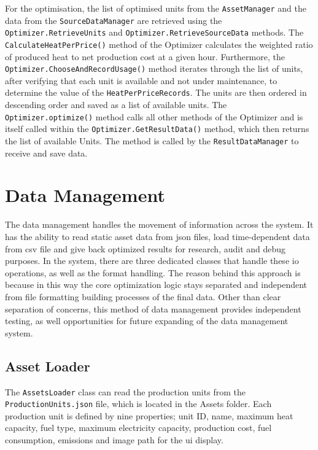 For the optimisation, the list of optimised units from the \texttt{AssetManager} and the data from the \texttt{SourceDataManager} are retrieved using the \texttt{Optimizer.}\allowbreak\texttt{RetrieveUnits} and \texttt{Optimizer.}\allowbreak\texttt{RetrieveSourceData} methods. 
The \allowbreak\texttt{CalculateHeatPerPrice()} method of the Optimizer calculates the weighted ratio of produced heat to net production cost at a given hour.
Furthermore, the \texttt{Optimizer.}\allowbreak\texttt{ChooseAndRecordUsage()} method iterates through the list of units, after verifying that each unit is available and not under maintenance, to determine the value of the \texttt{HeatPerPriceRecords}. The units are then ordered in descending order and saved as a list of available units. 
The \texttt{Optimizer.}\allowbreak\texttt{optimize()} method calls all other methods of the Optimizer and is itself called within the \texttt{Optimizer.}\allowbreak\texttt{GetResultData()} method, which then returns the list of available Units. The method is called by the \texttt{ResultDataManager} to receive and save data.

\section{Data Management}

The data management handles the movement of information across the system.
It has the ability to read static asset data from \acrshort{json} files, load time-dependent data from \acrshort{csv} file and give back optimized results for research, audit and debug purposes. In the system, there are three dedicated classes that handle these \acrshort{io} operations, as well as the format handling. The reason behind this approach is because in this way the core optimization logic stays separated and independent from file formatting building processes of the final data. Other than clear separation of concerns, this method of data management provides independent testing, as well opportunities for future expanding of the data management system.

\subsection{Asset Loader}

The \texttt{AssetsLoader} class can read the production units from the \texttt{Production\-Units.json} file,
which is located in the Assets folder.
Each production unit is defined by nine properties; unit ID, name, maximum heat capacity, fuel type, maximum electricity capacity,
production cost, fuel consumption, emissions and image path for the \acrshort{ui} display.

